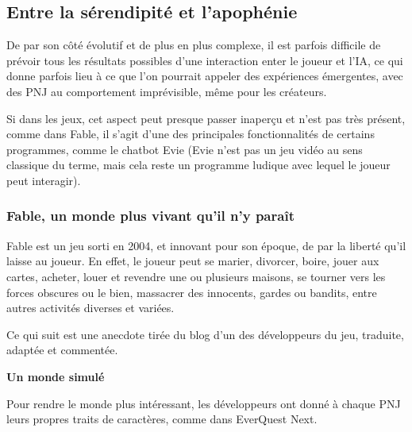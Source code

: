 \documentclass[a4paper, 12pt]{article} %
\begin{document}
\newpage
\subsection{Entre la sérendipité et l'apophénie}

De par son côté évolutif et de plus en plus complexe, il est parfois difficile de prévoir tous les résultats possibles d’une interaction enter le joueur et l’IA, ce qui donne parfois lieu à ce que l'on pourrait appeler des expériences émergentes, avec des PNJ au comportement imprévisible, même pour les créateurs.

Si dans les jeux, cet aspect peut presque passer inaperçu et n'est pas très présent, comme dans Fable, il s'agit d'une des principales fonctionnalités de certains programmes, comme le chatbot Evie (Evie n'est pas un jeu vidéo au sens classique du terme, mais cela reste un programme ludique avec lequel le joueur peut interagir).

\newpage
\subsubsection{Fable, un monde plus vivant qu'il n'y paraît}

Fable est un jeu sorti en 2004, et innovant pour son époque, de par la liberté qu’il laisse au joueur. En effet, le joueur peut se marier, divorcer, boire, jouer aux cartes, acheter, louer et revendre une ou plusieurs maisons, se tourner vers les forces obscures ou le bien, massacrer des innocents, gardes ou bandits, entre autres activités diverses et variées.

Ce qui suit est une anecdote tirée du blog d’un des développeurs du jeu, traduite, adaptée et commentée.

%
	
\textbf{Un monde simulé}

Pour rendre le monde plus intéressant, les développeurs ont donné à chaque PNJ leurs propres traits de caractères, comme dans EverQuest Next.
\end{document}
